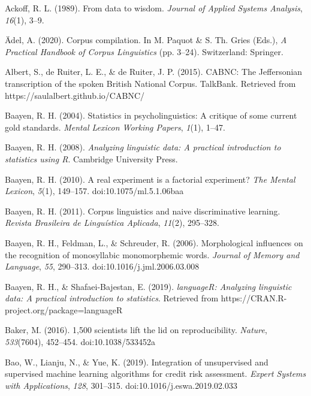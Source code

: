 \documentclass[
  letterpaper,
  krantz1]{latex/krantz-mod}
\newlength{\cslhangindent}
\newenvironment{CSLReferences}[2] %
 {\begin{list}{}{%
  \setlength{\itemindent}{0pt}
  \setlength{\leftmargin}{0pt}
  \setlength{\parsep}{0pt}
  \ifodd #1
   \setlength{\leftmargin}{\cslhangindent}
   \setlength{\itemindent}{-1\cslhangindent}
  \fi
  \setlength{\itemsep}{#2\baselineskip}}}
 {\end{list}}
\theoremstyle{definition}
\theoremstyle{definition}
\theoremstyle{remark}
\begin{document}
\label{refs}
\begin{CSLReferences}{1}{0}
Ackoff, R. L. (1989). From data to wisdom. \emph{Journal of Applied
Systems Analysis}, \emph{16}(1), 3--9.

Ädel, A. (2020). Corpus compilation. In M. Paquot \& S. Th. Gries
(Eds.), \emph{A {Practical Handbook} of {Corpus Linguistics}} (pp.
3--24). Switzerland: Springer.

Albert, S., de Ruiter, L. E., \& de Ruiter, J. P. (2015). {CABNC}: {The
Jeffersonian} transcription of the spoken {British National Corpus}.
TalkBank. Retrieved from https://saulalbert.github.io/CABNC/

Baayen, R. H. (2004). Statistics in psycholinguistics: A critique of
some current gold standards. \emph{Mental Lexicon Working Papers},
\emph{1}(1), 1--47.

Baayen, R. H. (2008). \emph{Analyzing linguistic data: A practical
introduction to statistics using {R}}. Cambridge University Press.

Baayen, R. H. (2010). A real experiment is a factorial experiment?
\emph{The Mental Lexicon}, \emph{5}(1), 149--157.
doi:10.1075/ml.5.1.06baa

Baayen, R. H. (2011). Corpus linguistics and naive discriminative
learning. \emph{Revista Brasileira de Lingu{í}stica Aplicada},
\emph{11}(2), 295--328.

Baayen, R. H., Feldman, L., \& Schreuder, R. (2006). Morphological
influences on the recognition of monosyllabic monomorphemic words.
\emph{Journal of Memory and Language}, \emph{55}, 290--313.
doi:10.1016/j.jml.2006.03.008

Baayen, R. H., \& Shafaei-Bajestan, E. (2019). \emph{{languageR}:
Analyzing linguistic data: A practical introduction to statistics}.
Retrieved from https://CRAN.R-project.org/package=languageR

Baker, M. (2016). 1,500 scientists lift the lid on reproducibility.
\emph{Nature}, \emph{533}(7604), 452--454. doi:10.1038/533452a

Bao, W., Lianju, N., \& Yue, K. (2019). Integration of unsupervised and
supervised machine learning algorithms for credit risk assessment.
\emph{Expert Systems with Applications}, \emph{128}, 301--315.
doi:10.1016/j.eswa.2019.02.033


\end{CSLReferences}
\end{document}
